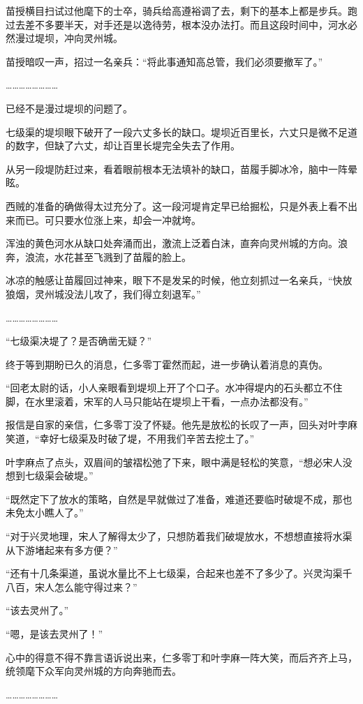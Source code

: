 苗授横目扫试过他麾下的士卒，骑兵给高遵裕调了去，剩下的基本上都是步兵。跑过去差不多要半天，对手还是以逸待劳，根本没办法打。而且这段时间中，河水必然漫过堤坝，冲向灵州城。

苗授暗叹一声，招过一名亲兵：“将此事通知高总管，我们必须要撤军了。”

……………………

已经不是漫过堤坝的问题了。

七级渠的堤坝眼下破开了一段六丈多长的缺口。堤坝近百里长，六丈只是微不足道的数字，但缺了六丈，却让百里长堤完全失去了作用。

从另一段堤防赶过来，看着眼前根本无法填补的缺口，苗履手脚冰冷，脑中一阵晕眩。

西贼的准备的确做得太过充分了。这一段河堤肯定早已给掘松，只是外表上看不出来而已。可只要水位涨上来，却会一冲就垮。

浑浊的黄色河水从缺口处奔涌而出，激流上泛着白沫，直奔向灵州城的方向。浪奔，浪流，水花甚至飞溅到了苗履的脸上。

冰凉的触感让苗履回过神来，眼下不是发呆的时候，他立刻抓过一名亲兵，“快放狼烟，灵州城没法儿攻了，我们得立刻退军。”

……………………

“七级渠决堤了？是否确凿无疑？”

终于等到期盼已久的消息，仁多零丁霍然而起，进一步确认着消息的真伪。

“回老太尉的话，小人亲眼看到堤坝上开了个口子。水冲得堤内的石头都立不住脚，在水里滚着，宋军的人马只能站在堤坝上干看，一点办法都没有。”

报信是自家的亲信，仁多零丁没了怀疑。他先是放松的长叹了一声，回头对叶孛麻笑道，“幸好七级渠及时破了堤，不用我们辛苦去挖土了。”

叶孛麻点了点头，双眉间的皱褶松弛了下来，眼中满是轻松的笑意，“想必宋人没想到七级渠会破堤。”

“既然定下了放水的策略，自然是早就做过了准备，难道还要临时破堤不成，那也未免太小瞧人了。”

“对于兴灵地理，宋人了解得太少了，只想防着我们破堤放水，不想想直接将水渠从下游堵起来有多方便？”

“还有十几条渠道，虽说水量比不上七级渠，合起来也差不了多少了。兴灵沟渠千八百，宋人怎么能守得过来？”

“该去灵州了。”

“嗯，是该去灵州了！”

心中的得意不得不靠言语诉说出来，仁多零丁和叶孛麻一阵大笑，而后齐齐上马，统领麾下众军向灵州城的方向奔驰而去。

……………………

